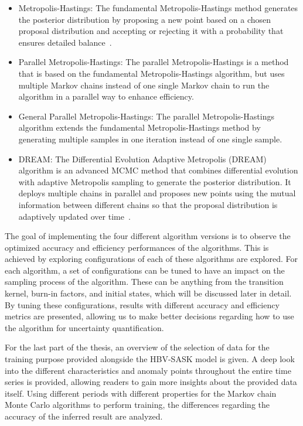 \begin{itemize}
    \item Metropolis-Hastings: The fundamental Metropolis-Hastings method generates the posterior distribution by proposing a new point based on a chosen proposal distribution and accepting or rejecting it with a probability that ensures detailed balance~\cite{detailed_balance}.
    \item Parallel Metropolis-Hastings: The parallel Metropolis-Hastings is a method that is based on the fundamental Metropolis-Hastings algorithm, but uses multiple Markov chains instead of one single Markov chain to run the algorithm in a parallel way to enhance efficiency.
    \item General Parallel Metropolis-Hastings: The parallel Metropolis-Hastings algorithm extends the fundamental Metropolis-Hastings method by generating multiple samples in one iteration instead of one single sample.
    \item DREAM: The Differential Evolution Adaptive Metropolis (DREAM) algorithm is an advanced MCMC method that combines differential evolution with adaptive Metropolis sampling to generate the posterior distribution. It deploys multiple chains in parallel and proposes new points using the mutual information between different chains so that the proposal distribution is adaptively updated over time~\cite{dream}.
\end{itemize}

The goal of implementing the four different algorithm versions is to observe the optimized accuracy and efficiency performances of the algorithms. This is achieved by exploring configurations of each of these algorithms are explored. For each algorithm, a set of configurations can be tuned to have an impact on the sampling process of the algorithm. These can be anything from the transition kernel, burn-in factors, and initial states, which will be discussed later in detail. By tuning these configurations, results with different accuracy and efficiency metrics are presented, allowing us to make better decisions regarding how to use the algorithm for uncertainty quantification.

For the last part of the thesis, an overview of the selection of data for the training purpose provided alongside the HBV-SASK model is given. A deep look into the different characteristics and anomaly points throughout the entire time series is provided, allowing readers to gain more insights about the provided data itself. Using different periods with different properties for the Markov chain Monte Carlo algorithms to perform training, the differences regarding the accuracy of the inferred result are analyzed.